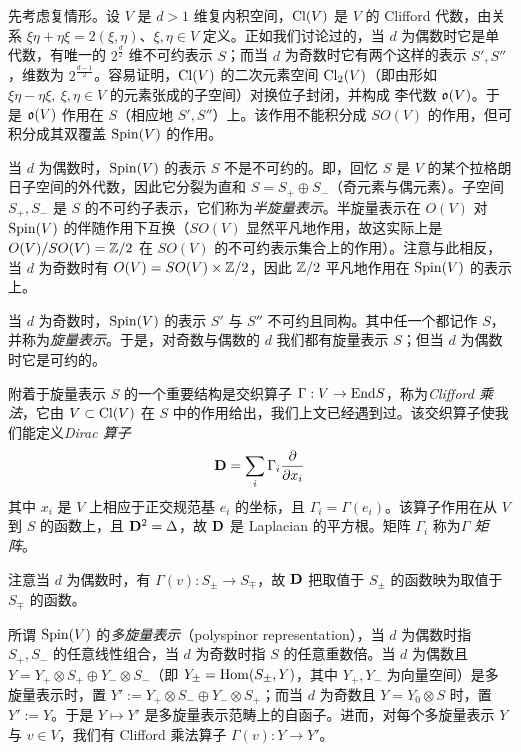 先考虑复情形。设 $V$ 是 $d>1$ 维复内积空间，${\rm Cl}(V)$ 是 $V$ 的 Clifford 代数，由关系 $\xi\eta+\eta\xi=2(\xi,\eta)$、$\xi,\eta\in V$ 定义。正如我们讨论过的，当 $d$ 为偶数时它是单代数，有唯一的 $2^{\frac{d}{2}}$ 维不可约表示 $S$；而当 $d$ 为奇数时它有两个这样的表示 $S',S''$，维数为 $2^{\frac{d-1}{2}}$。容易证明，${\rm Cl}(V)$ 的二次元素空间 ${\rm Cl}_2(V)$（即由形如 $\xi\eta-\eta\xi,\ \xi,\eta\in V$ 的元素张成的子空间）对换位子封闭，并构成 李代数 ${\frak o}(V)$。于是 ${\frak o}(V)$ 作用在 $S$（相应地 $S',S''$）上。该作用不能积分成 $SO(V)$ 的作用，但可积分成其双覆盖 ${\rm Spin}(V)$ 的作用。

当 $d$ 为偶数时，${\rm Spin}(V)$ 的表示 $S$ 不是不可约的。即，回忆 $S$ 是 $V$ 的某个拉格朗日子空间的外代数，因此它分裂为直和 $S=S_+\oplus S_-$（奇元素与偶元素）。子空间 $S_+,S_-$ 是 $S$ 的不可约子表示，它们称为\emph{半旋量表示}。半旋量表示在 $O(V)$ 对 ${\rm Spin}(V)$ 的伴随作用下互换（$SO(V)$ 显然平凡地作用，故这实际上是 $O(V)/SO(V)=\Bbb Z/2$ 在 $SO(V)$ 的不可约表示集合上的作用）。注意与此相反，当 $d$ 为奇数时有 $O(V)=SO(V)\times \Bbb Z/2$，因此 $\Bbb Z/2$ 平凡地作用在 ${\rm Spin}(V)$ 的表示上。

当 $d$ 为奇数时，${\rm Spin}(V)$ 的表示 $S'$ 与 $S''$ 不可约且同构。其中任一个都记作 $S$，并称为\emph{旋量表示}。于是，对奇数与偶数的 $d$ 我们都有旋量表示 $S$；但当 $d$ 为偶数时它是可约的。

附着于旋量表示 $S$ 的一个重要结构是交织算子 $\Gamma: V\to {\rm End}S$，称为\emph{Clifford 乘法}，它由 $V\subset {\rm Cl}(V)$ 在 $S$ 中的作用给出，我们上文已经遇到过。该交织算子使我们能定义\emph{Dirac 算子}
\begin{equation}\label{dirop}
\bold{D}=\sum_i \Gamma_i \frac{\partial}{\partial x_i}
\end{equation}
其中 $x_i$ 是 $V$ 上相应于正交规范基 $e_i$ 的坐标，且 $\Gamma_i=\Gamma(e_i)$。该算子作用在从 $V$ 到 $S$ 的函数上，且 $\bold D^2=\Delta$，故 $\bold D$ 是 Laplacian 的平方根。矩阵 $\Gamma_i$ 称为\emph{$\Gamma$ 矩阵}。

注意当 $d$ 为偶数时，有 $\Gamma(v): S_\pm\to S_\mp$，故 $\bold D$ 把取值于 $S_\pm$ 的函数映为取值于 $S_\mp$ 的函数。

所谓 ${\rm Spin}(V)$ 的\emph{多旋量表示}（polyspinor representation），当 $d$ 为偶数时指 $S_+,S_-$ 的任意线性组合，当 $d$ 为奇数时指 $S$ 的任意重数倍。当 $d$ 为偶数且 $Y=Y_+\otimes S_+\oplus Y_-\otimes S_-$（即 $Y_{\pm}={\rm Hom}(S_\pm,Y)$，其中 $Y_+,Y_-$ 为向量空间）是多旋量表示时，置 $Y':=Y_+\otimes S_-\oplus Y_-\otimes S_+$；而当 $d$ 为奇数且 $Y=Y_0\otimes S$ 时，置 $Y':=Y$。于是 $Y\mapsto Y'$ 是多旋量表示范畴上的自函子。进而，对每个多旋量表示 $Y$ 与 $v\in V$，我们有 Clifford 乘法算子 $\Gamma(v): Y\to Y'$。

